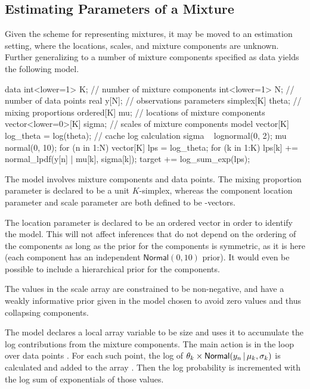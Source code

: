 \subsection{Estimating Parameters of a Mixture}

Given the scheme for representing mixtures, it may be moved to an
estimation setting, where the locations, scales, and mixture
components are unknown.  Further generalizing to a number of mixture
components specified as data yields the following model.
%
\begin{stancode}
data {
  int<lower=1> K;          // number of mixture components
  int<lower=1> N;          // number of data points
  real y[N];               // observations
}
parameters {
  simplex[K] theta;          // mixing proportions
  ordered[K] mu;             // locations of mixture components
  vector<lower=0>[K] sigma;  // scales of mixture components
}
model {
  vector[K] log_theta = log(theta);  // cache log calculation
  sigma ~ lognormal(0, 2);
  mu ~ normal(0, 10);
  for (n in 1:N) {
    vector[K] lps = log_theta;
    for (k in 1:K)
      lps[k] += normal_lpdf(y[n] | mu[k], sigma[k]);
    target += log_sum_exp(lps);
  }
}
\end{stancode}
%
The model involves  mixture components and  data
points. The mixing proportion parameter  is declared to be
a unit $K$-simplex, whereas the component location parameter 
and scale parameter  are both defined to be
-vectors.

The location parameter  is declared to be an ordered vector
in order to identify the model.  This will not affect inferences that
do not depend on the ordering of the components as long as the prior
for the components  is symmetric, as it is here (each
component has an independent $\mathsf{Normal}(0, 10)$ prior).  It
would even be possible to include a hierarchical prior for the components.

The values in the scale array  are constrained to be
non-negative, and have a weakly informative prior given in the model
chosen to avoid zero values and thus collapsing components.

The model declares a local array variable  to be size
 and uses it to accumulate the log contributions from the
mixture components.  The main action is in the loop over data points
.  For each such point, the log of $\theta_k \times
\mbox{\sf Normal}(y_n \, | \, \mu_k,\sigma_k)$ is calculated and added to the
array .  Then the log probability is incremented with the log
sum of exponentials of those values.

